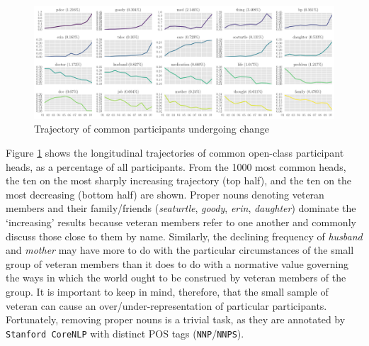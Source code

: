     \begin{figure}[htb]
    \centering
    \small
    \includegraphics[width=1\textwidth]{../images/part-traj2.png}
    \caption{Trajectory of common participants undergoing change}
    \label{tab:key_part_w_prop}
    \end{figure}
%
Figure \ref{tab:key_part_w_prop} shows the longitudinal trajectories of common open\hyp{}class participant heads, as a percentage of all participants. From the 1000 most common heads, the ten on the most sharply increasing trajectory (top half), and the ten on the most decreasing (bottom half) are shown. Proper nouns denoting veteran \glspl{member} and their family\slash friends (\emph{seaturtle}, \emph{goody}, \emph{erin}, \emph{daughter}) dominate the `increasing' results because veteran \glspl{member} refer to one another and commonly discuss those close to them by name. Similarly, the declining frequency of \emph{husband} and \emph{mother} may have more to do with the particular circumstances of the small group of veteran members than it does to do with a normative value governing the ways in which the world ought to be construed by veteran members of the group. It is important to keep in mind, therefore, that the small sample of veteran  can cause an over\slash under\hyp{}representation of particular participants. Fortunately, removing proper nouns is a trivial task, as they are annotated by \texttt{Stanford CoreNLP} with distinct \gls{POS} tags (\texttt{NNP}\slash \texttt{NNPS}). 

